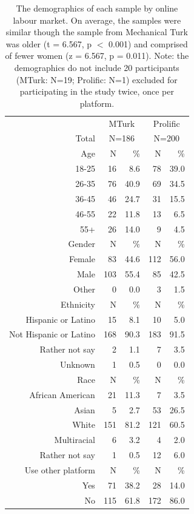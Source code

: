 \documentclass[a4paper,notitlepage,12pt]{article}
\begin{document}
\begin{table}[!h]
\centering
\small
\setlength{\tabcolsep}{15pt}
\begin{tabular}{ rrrrr }
\toprule
& \multicolumn{2}{c}{MTurk} & \multicolumn{2}{c}{Prolific} \\
\cmidrule(lr){2-3} \cmidrule(lr){4-5}
Total & \multicolumn{2}{c}{N=186} & \multicolumn{2}{c}{N=200} \\
\midrule
Age & N & \% & N & \% \\
\cmidrule(lr){1-5}
18-25   &      16 &   8.6 &       78 &  39.0 \\
26-35   &      76 &  40.9 &       69 &  34.5 \\
36-45   &      46 &  24.7 &       31 &  15.5 \\
46-55   &      22 &  11.8 &       13 &   6.5 \\
55+     &      26 &  14.0 &        9 &   4.5 \\
\midrule
Gender & N & \% & N & \% \\
\cmidrule(lr){1-5}
Female             &    83 &  44.6 &    112 &  56.0 \\
Male               &   103 &  55.4 &     85 &  42.5 \\
Other              &     0 &   0.0 &      3 &   1.5 \\
\midrule
Ethnicity & N & \% & N & \% \\
\cmidrule(lr){1-5}
Hispanic or Latino     &    15 &   8.1 &     10 &   5.0 \\
Not Hispanic or Latino &   168 &  90.3 &    183 &  91.5 \\
Rather not say         &     2 &   1.1 &      7 &   3.5 \\
Unknown                &     1 &   0.5 &      0 &   0.0 \\
\midrule
Race & N & \% & N & \% \\
\cmidrule(lr){1-5}
African American                 &    21 &  11.3 &      7 &   3.5 \\
Asian                                     &     5 &   2.7 &     53 &  26.5 \\
White                                     &   151 &  81.2 &    121 &  60.5 \\
Multiracial                               &     6 &   3.2 &      4 &   2.0 \\
Rather not say                            &     1 &   0.5 &     12 &   6.0 \\
\midrule
Use other platform & N & \% & N & \% \\
\cmidrule(lr){1-5}
Yes            &      71 &  38.2 &       28 &  14.0 \\
No             &     115 &  61.8 &      172 &  86.0 \\
\bottomrule
\end{tabular}
\caption{The demographics of each sample by online labour market. On average, the samples were similar though the sample from Mechanical Turk was older (t = 6.567, p $<$ 0.001) and comprised of fewer women (z = 6.567, p = 0.011). Note: the demographics do not include 20 participants (MTurk: N=19; Prolific: N=1) excluded for participating in the study twice, once per platform.}
\label{tab:demographics}
\end{table}
\end{document}
